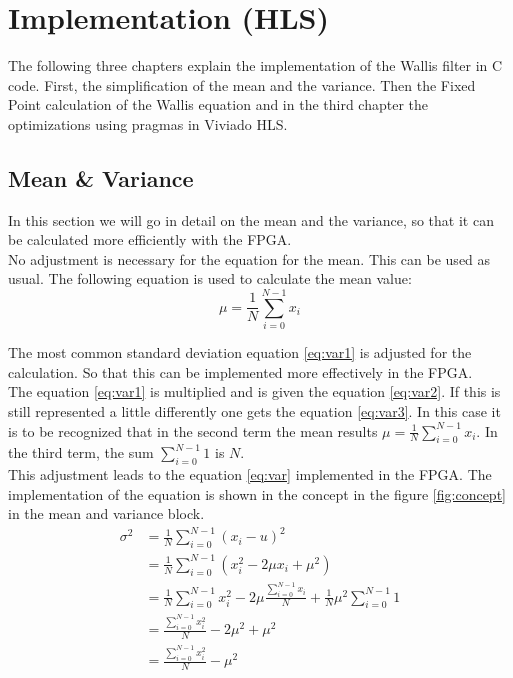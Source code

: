 \section{Implementation (HLS)}
The following three chapters explain the implementation of the Wallis filter in C code. First, the simplification of the mean and the variance. Then the Fixed Point calculation of the Wallis equation and in the third chapter the optimizations using pragmas in Viviado HLS.

\subsection{Mean \& Variance}
In this section we will go in detail on the mean and the variance, so that it can be calculated more efficiently with the FPGA. \\
No adjustment is necessary for the equation for the mean. This can be used as usual. The following equation	 is used to calculate the mean value:
\begin{equation}
    \mu = \frac{1}{N} \sum_{i = 0}^{N - 1} x_{i}
    \label{eq:mean}
\end{equation} 

The most common standard deviation equation \ref{eq:var1} is adjusted for the calculation. So that this can be implemented more effectively in the FPGA. \\
The equation \ref{eq:var1} is multiplied and is given the equation \ref{eq:var2}. If this is still represented a little differently one gets the equation \ref{eq:var3}. In this case it is to be recognized that in the second term the mean results $\mu = \frac{1}{N} \sum_{i = 0}^{N - 1} x_{i}$. In the third term, the sum $\sum_{i = 0}^{N - 1} 1$ is $N$. \\
This adjustment leads to the equation \ref{eq:var} implemented in the FPGA. The implementation of the equation is shown in the concept in the figure \ref{fig:concept} in the mean and variance block.
\begin{align}
    \sigma^{2} & = \frac{1}{N} \sum_{i = 0}^{N - 1} (x_{i} - u)^{2} \label{eq:var1}\\ 
    		& = \frac{1}{N} \sum_{i = 0}^{N - 1} (x_{i}^{2} - 2 \mu x_{i} + \mu^{2})  \label{eq:var2}\\
    		& = \frac{1}{N} \sum_{i = 0}^{N - 1} x_{i}^{2} - 2\mu \frac{\sum_{i = 0}^{N - 1} x_{i}}{N} + \frac{1}{N} \mu^{2} \sum_{i = 0}^{N - 1} 1 \label{eq:var3}\\
    		& = \frac{\sum_{i = 0}^{N - 1} x_{i}^{2}}{N}  - 2\mu^{2} + \mu^{2} \label{eq:var4}\\
    		& = \frac{\sum_{i = 0}^{N - 1} x_{i}^{2}}{N}  - \mu^{2}
    \label{eq:var}
\end{align}

